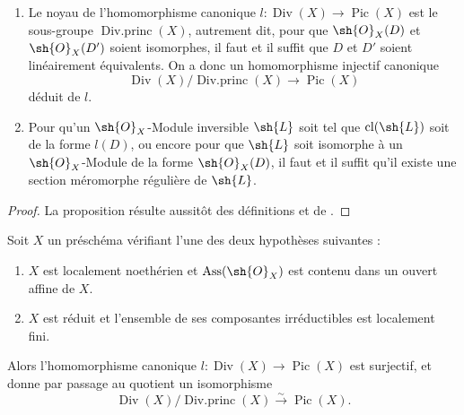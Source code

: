 \begin{proposition}[21.3.3]
\label{IV.21.3.3}
\begin{enumerate}[label=\textup{(\roman*)}]
  \item Le noyau de l'homomorphisme canonique $l:\operatorname{Div}(X)\to\operatorname{Pic}(X)$ est le sous-groupe $\operatorname{Div.princ}(X)$, autrement dit, pour que $\sh{O}_X(D)$ et $\sh{O}_X(D')$ soient isomorphes, il faut et il suffit que $D$ et $D'$ soient linéairement équivalents.
  On a donc un homomorphisme \textup{injectif} canonique
  \[
  \label{IV.21.3.3.1}
    \operatorname{Div}(X)/\operatorname{Div.princ}(X)\to\operatorname{Pic}(X)
    \tag{21.3.3.1}
  \]
  déduit de $l$.
  \item Pour qu'un $\sh{O}_X$-Module inversible $\sh{L}$ soit tel que $\operatorname{cl}(\sh{L})$ soit de la forme $l(D)$, ou encore pour que $\sh{L}$ soit isomorphe à un $\sh{O}_X$-Module de la forme $\sh{O}_X(D)$, il faut et il suffit qu'il existe une section méromorphe régulière de $\sh{L}$.
\end{enumerate}
\end{proposition}

\begin{proof}
La proposition résulte aussitôt des définitions et de .
\end{proof}

\begin{proposition}[21.3.4]
\label{IV.21.3.4}
Soit $X$ un préschéma vérifiant l'une des deux hypothèses suivantes :
\begin{enumerate}[label=\emph{\alph*)}]
  \item $X$ est localement noethérien et $\operatorname{Ass}(\sh{O}_X)$ est contenu dans un ouvert affine de $X$.
  \item $X$ est réduit et l'ensemble de ses composantes irréductibles est localement fini.
\end{enumerate}

Alors l'homomorphisme canonique $l:\operatorname{Div}(X)\to\operatorname{Pic}(X)$ est surjectif, et donne par passage au quotient un isomorphisme
\[
  \operatorname{Div}(X)/\operatorname{Div.princ}(X)\xrightarrow{\sim}\operatorname{Pic}(X).
\]
\end{proposition}

